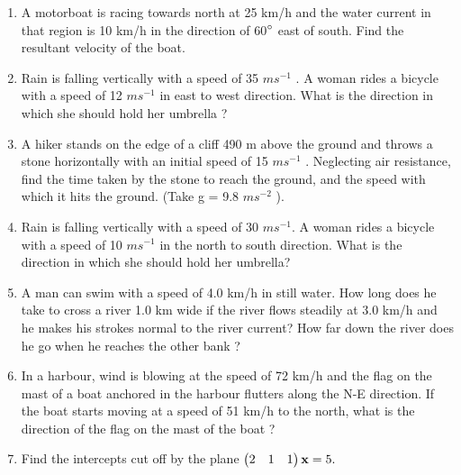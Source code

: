 \documentclass[journal,12pt,twocolumn]{IEEEtran}
\renewcommand\thesection{\arabic{section}}
\begin{document}
\begin{enumerate}[label=\thesection.\arabic*.,ref=\thesection.\theenumi]
\item A motorboat is racing towards north at 25 km/h and the water current in that region is 10 km/h in the direction of 60$\degree$ east of south. Find the resultant velocity of the boat.
\\
\solution 
%
\item Rain is falling vertically with a speed of 35 $m s^{-1}$
. A woman rides a bicycle with a speed of 12 $ms^{-1}$ in east to west
direction. What is the direction in which she should hold her umbrella ?
\\
\solution 
%
\item  A hiker stands on the edge of a cliff 490 m above the ground and throws a stone horizontally with an initial speed of 15 $m s^{-1}$
. Neglecting air resistance,
find the time taken by the stone to reach the ground, and the speed with which it hits the ground. (Take g = 9.8 $m s^{-2}$
).
\\
\solution 
%
\item Rain is falling vertically with a speed of 30 $m s^{-1}$. A woman rides a bicycle with a speed  of 10 $m s^{-1}$ in the north to south direction. What is the direction in which she should
hold her umbrella?
\\
\solution 
%
\item A man can swim with a speed of 4.0 km/h in still water. How long does he take to cross a river 1.0 km wide if the river flows steadily at 3.0 km/h and he makes his strokes normal to the river current? How far down the river does he go when he reaches the other bank ?
\\
\solution 
%
\item In a harbour, wind is blowing at the speed of 72 km/h and the flag on the mast of a boat anchored in the harbour flutters along the N-E direction. If the boat starts moving at a speed of 51 km/h to the north, what is the direction of the flag on the mast of the boat ?
\\
\solution 
%

\item Find the intercepts cut off by the plane 
$
\begin{pmatrix}2 & 1 & 1\end{pmatrix}\mathbf{x}=5.
$
\end{enumerate}
\end{document}
